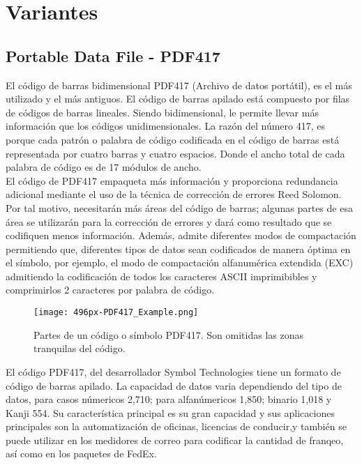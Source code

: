 
\section{Variantes}

\subsection{Portable Data File - PDF417}
El código de barras bidimensional PDF417 (Archivo de datos portátil), es el más utilizado y el más antiguos. El código de barras apilado está compuesto por filas de códigos de barras lineales. Siendo bidimensional, le permite llevar más información que los códigos unidimensionales. La razón del número 417, es porque cada patrón o palabra de código codificada en el código de barras está representada por cuatro barras y cuatro espacios. Donde el ancho total de cada palabra de código es de 17 módulos de ancho.
\\
El código de PDF417 empaqueta más información y proporciona redundancia adicional mediante el uso de la técnica de corrección de errores Reed Solomon. Por tal motivo, necesitarán más áreas del código de barras; algunas partes de esa área se utilizarán para la corrección de errores y dará como resultado que se codifiquen menos información. Además, admite diferentes modos de compactación permitiendo que, diferentes tipos de datos sean codificados de manera óptima en el símbolo, por ejemplo, el modo de compactación alfanumérica extendida (EXC) admitiendo la codificación de todos los caracteres ASCII imprimibibles y comprimirlos 2 caracteres por palabra de código.\cite{PDF417Barcode2021}
\begin{figure} 
	\centering
	\texttt{[image: 496px-PDF417\_Example.png]}
	\caption{Partes de un código o símbolo PDF417. Son omitidas las zonas tranquilas del código.}
	\label{fig:pdf417example}
\end{figure} 

El código PDF417, del desarrollador Symbol Technologies tiene un formato de código de barras apilado. La capacidad de datos varia dependiendo del tipo de datos, para casos númericos 2,710; para alfanúmericos 1,850; binario 1,018 y Kanji 554. Su característica principal es su gran capacidad y sus aplicaciones principales son la automatización de oficinas, licencias de conducir,y también se puede utilizar en los medidores de correo para codificar la cantidad de franqeo, así como en los paquetes de FedEx.\cite{2012_DENSO,2004_FedEx_TECH_REPORT}

